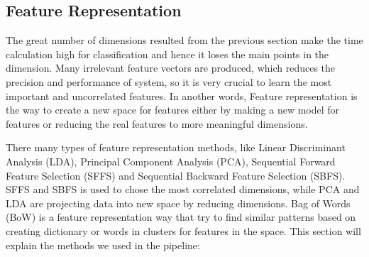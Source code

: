\subsection{Feature Representation}
The great number of dimensions resulted from the previous section make the time calculation high for classification and hence it loses the main points in the dimension.
Many irrelevant feature vectors are produced, which reduces the precision and performance of system, so it is very crucial to learn the most important and uncorrelated features.
In another words, Feature representation is the way to create a new space for features either by making a new model for features or reducing the real features to more meaningful dimensions. 

There many types of feature representation methods, like Linear Discriminant Analysis (LDA), Principal Component Analysis (PCA), Sequential Forward Feature Selection (SFFS) and Sequential Backward Feature Selection (SBFS).
SFFS and SBFS is used to chose the most correlated dimensions, while PCA and LDA are projecting data into new space by reducing dimensions.
Bag of Words (BoW) is a feature representation way that try to find similar patterns based on creating dictionary or words in clusters for features in the space.
This section will explain the methods we used in the pipeline:

